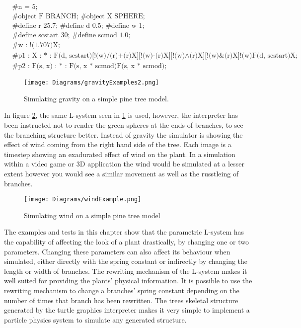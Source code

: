 \begin{singlespace}
\begin{equation}
\begin{aligned}
	&\textrm{\#n = 5;} \\
	&\textrm{\#object F BRANCH; \#object X SPHERE;}\\
	&\textrm{\#define r 25.7; \#define d 0.5; \#define w 1;}\\
	&\textrm{\#define scstart 30; \#define scmod 1.0;}\\
	&\textrm{\#w : !(1.707)X;}\\
	&\textrm{\#p1 : X : * : F(d, scstart)[!(w)/(r)+(r)X][!(w)-(r)X][!(w)$\land$(r)X][!(w)\&(r)X]!(w)F(d, scstart)X;}\\
	&\textrm{\#p2 : F(s, x) : * : F(s, x * scmod)F(s, x * scmod);}
\end{aligned}
\end{equation}
\end{singlespace}

\begin{figure}[htbp]
	{\centering
		\vspace{7px}
		\texttt{[image: Diagrams/gravityExamples2.png]}
		\label{3DAxisFigure} \label{Gravity applied to generated model 1}
		\caption{Simulating gravity on a simple pine tree model.}
	}
\end{figure}
\FloatBarrier


In figure \ref{Wind applied to generated model}, the same L-system seen in \ref{Gravity applied to generated model 1} is used, however, the interpreter has been instructed not to render the green spheres at the ends of branches, to see the branching structure better. Instead of gravity the simulator is showing the effect of wind coming from the right hand side of the tree. Each image is a timestep showing an exadurated effect of wind on the plant. In a simulation within a video game or 3D application the wind would be simulated at a lesser extent however you would see a similar movement as well as the russtleing of branches.

\begin{figure}[htbp]
	{\centering
		\vspace{7px}
		\texttt{[image: Diagrams/windExample.png]}
		\label{3DAxisFigure} \label{Wind applied to generated model}
		\caption{Simulating wind on a simple pine tree model}
	}
\end{figure}
\FloatBarrier

\noindent
The examples and tests in this chapter show that the parametric L-system has the capability of affecting the look of a plant drastically, by changing one or two parameters. Changing these parameters can also affect its behaviour when simulated, either directly with the spring constant or indirectly by changing the length or width of branches. The rewriting mechanism of the L-system makes it well suited for providing the plants' physical information. It is possible to use the rewriting mechanism to change a branches' spring constant depending on the number of times that branch has been rewritten. The trees skeletal structure generated by the turtle graphics interpreter makes it very simple to implement a particle physics system to simulate any generated structure. 


